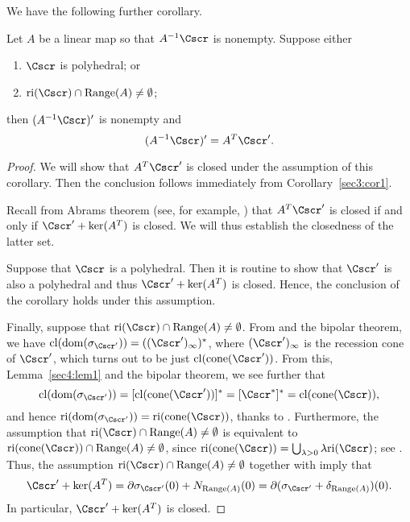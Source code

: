 \documentclass{siamltex}   %
\begin{document}
  We have the following further corollary.
  \begin{corollary}\label{sec3:cor2}
    Let $A$ be a linear map so that $A^{-1}\Cscr$ is nonempty. Suppose either
    \begin{enumerate}[{\rm (i)}]
      \item $\Cscr$ is polyhedral; or
      \item ${\rm ri}(\Cscr)\cap {\rm Range}(A)\neq\emptyset$;
    \end{enumerate}
    then $(A^{-1}\Cscr)'$ is nonempty and
    \begin{equation}\label{sec3:antipolarinvAC}
    (A^{-1}\Cscr)' = A^T\Cscr'.
    \end{equation}
  \end{corollary}
  \begin{proof}
    We will show that $A^T\Cscr'$ is closed under the assumption of this corollary.
    Then the conclusion follows immediately from Corollary~\ref{sec3:cor1}.

    Recall from Abrams theorem (see, for example, \cite[Lemma~3.1]{Berman:1973}) that $A^T\Cscr'$ is closed if
    and only if $\Cscr' + \ker(A^T)$ is closed. We will thus establish the closedness of the latter set. 
    
    Suppose that $\Cscr$ is a polyhedral. Then it is routine to show that $\Cscr'$ is also a polyhedral and thus 
    $\Cscr' + \ker(A^T)$ is closed. Hence, the conclusion of the corollary holds under this assumption.
    
    Finally, suppose that ${\rm ri}(\Cscr)\cap {\rm Range}(A)\neq\emptyset$. 
    From \cite[Theorem~2.2.1]{AuT03} and the bipolar theorem, we have
    ${\rm cl}({\rm dom}(\sigma_{\Cscr'})) = ((\Cscr')_\infty)^*$, where $(\Cscr')_\infty$ is the recession cone of $\Cscr'$, which 
    turns out to be just ${\rm cl}({\rm cone}(\Cscr'))$. From this, Lemma~\ref{sec4:lem1} and the bipolar theorem, we see further that
    \[
    {\rm cl}({\rm dom}(\sigma_{\Cscr'})) = [{\rm cl}({\rm cone}(\Cscr'))]^* = [\Cscr^*]^* = {\rm cl}({\rm cone}(\Cscr)),
    \]
    and hence ${\rm ri}({\rm dom}(\sigma_{\Cscr'})) = {\rm ri}({\rm cone}(\Cscr))$, thanks to \cite[Theorem~6.3]{Roc70}. Furthermore, the assumption that
    ${\rm ri}(\Cscr)\cap {\rm Range}(A)\neq \emptyset$ is equivalent to ${\rm ri}({\rm cone}(\Cscr))\cap {\rm Range}(A)\neq \emptyset$, since
    ${\rm ri}({\rm cone}(\Cscr)) = \bigcup_{\lambda > 0}\lambda{\rm ri}(\Cscr)$; see \cite[Page~50]{Roc70}. Thus, the assumption
    ${\rm ri}(\Cscr)\cap {\rm Range}(A)\neq\emptyset$ together with \cite[Theorem~23.8]{Roc70} imply that 
    \begin{equation}\label{sec3:sum1}
      \Cscr' + \ker(A^T) = \partial \sigma_{\Cscr'}(0) + N_{{\rm Range}(A)}(0) = \partial(\sigma_{\Cscr'} + \delta_{{\rm Range}(A)})(0).
    \end{equation}
    In particular, $\Cscr' + \ker(A^T)$ is closed.
  \end{proof}
\end{document}
